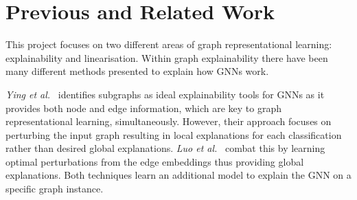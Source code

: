 %



\section{Previous and Related Work}
This project focuses on two different areas of graph representational learning: explainability and linearisation.
Within graph explainability there have been many different methods presented to explain how GNNs work.

\textit{Ying et al.}~\cite{ying2019gnnexplainer} identifies subgraphs as ideal explainability tools for GNNs as it provides both node and edge information, which are key to graph representational learning, simultaneously. 
However, their approach focuses on perturbing the input graph resulting in local explanations for each classification rather than desired global explanations.
\textit{Luo et al.}~\cite{luo2020parameterized} combat this by learning optimal perturbations from the edge embeddings thus providing global explanations.
Both techniques learn an additional model to explain the GNN on a specific graph instance.

